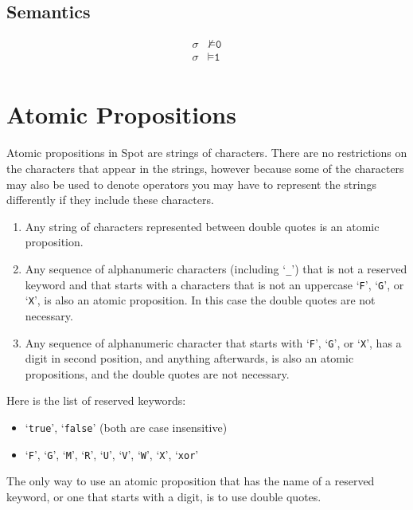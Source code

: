 \documentclass[a4paper,twoside,10pt,DIV=12,draft]{scrreprt}
\newcommand{\0}{\texttt{0}}
\newcommand{\1}{\texttt{1}}
\newcommand\samp[1]{`\texttt{#1}'}
\begin{document}
\subsection{Semantics}

\begin{align*}
  \sigma &\nvDash \0 \\
  \sigma &\vDash \1 \\
\end{align*}

\section{Atomic Propositions}\label{sec:ap}

Atomic propositions in Spot are strings of characters.  There are no
restrictions on the characters that appear in the strings, however
because some of the characters may also be used to denote operators
you may have to represent the strings differently if they include
these characters.

\begin{enumerate}
\item Any string of characters represented between double quotes is an
  atomic proposition.
\item Any sequence of alphanumeric characters \label{rule:ap2}
  (including \samp{\_}) that is not a reserved keyword and that starts
  with a characters that is not an uppercase \samp{F}, \samp{G}, or
  \samp{X}, is also an atomic proposition.  In this case the double
  quotes are not necessary.
\item \label{rule:ap3} Any sequence of alphanumeric character that
  starts with \samp{F}, \samp{G}, or \samp{X}, has a digit in second
  position, and anything afterwards, is also an atomic propositions,
  and the double quotes are not necessary.
\end{enumerate}

Here is the list of reserved keywords:
\begin{itemize}
\item \samp{true}, \samp{false}  (both are case insensitive)
\item \samp{F}, \samp{G}, \samp{M}, \samp{R}, \samp{U}, \samp{V},
  \samp{W}, \samp{X}, \samp{xor}
\end{itemize}

The only way to use an atomic proposition that has the name of a
reserved keyword, or one that starts with a digit, is to use double quotes.
\end{document}

